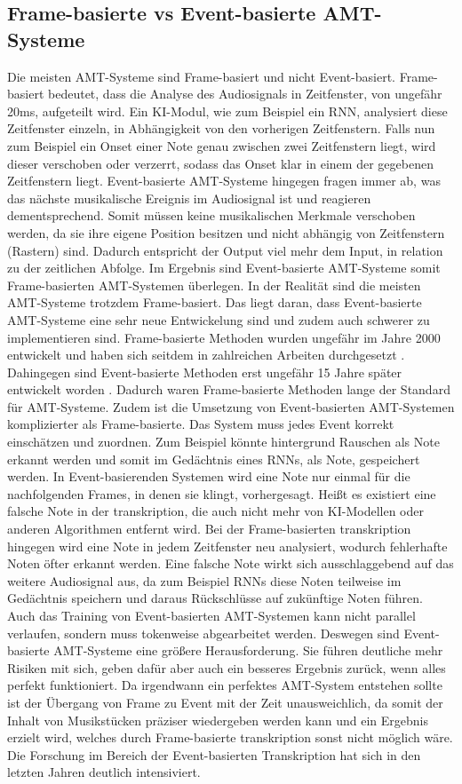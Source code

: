 \subsection{Frame-basierte vs Event-basierte AMT-Systeme}
Die meisten AMT-Systeme sind Frame-basiert und nicht Event-basiert.
Frame-basiert bedeutet, dass die Analyse des Audiosignals in Zeitfenster, von ungefähr 20ms, aufgeteilt wird.
Ein KI-Modul, wie zum Beispiel ein RNN, analysiert diese Zeitfenster einzeln,
in Abhängigkeit von den vorherigen Zeitfenstern.
Falls nun zum Beispiel ein Onset einer Note genau zwischen zwei Zeitfenstern liegt,
wird dieser verschoben oder verzerrt, sodass das Onset klar in einem der gegebenen Zeitfenstern liegt.
Event-basierte AMT-Systeme hingegen fragen immer ab,
was das nächste musikalische Ereignis im Audiosignal ist und reagieren dementsprechend.
Somit müssen keine musikalischen Merkmale verschoben werden,
da sie ihre eigene Position besitzen und nicht abhängig von Zeitfenstern (Rastern) sind.
Dadurch entspricht der Output viel mehr dem Input, in relation zu der zeitlichen Abfolge.
Im Ergebnis sind Event-basierte AMT-Systeme somit Frame-basierten AMT-Systemen überlegen.
In der Realität sind die meisten AMT-Systeme trotzdem Frame-basiert.
Das liegt daran, dass Event-basierte AMT-Systeme eine sehr neue Entwickelung sind
und zudem auch schwerer zu implementieren sind.
Frame-basierte Methoden wurden ungefähr im Jahre 2000 entwickelt
und haben sich seitdem in zahlreichen Arbeiten durchgesetzt .
Dahingegen sind Event-basierte Methoden erst ungefähr 15 Jahre später entwickelt worden .
Dadurch waren Frame-basierte Methoden lange der Standard für AMT-Systeme.
Zudem ist die Umsetzung von Event-basierten AMT-Systemen komplizierter als Frame-basierte.
Das System muss jedes Event korrekt einschätzen und zuordnen.
Zum Beispiel könnte hintergrund Rauschen als Note erkannt werden und somit im
Gedächtnis eines RNNs, als Note, gespeichert werden.
In Event-basierenden Systemen wird eine Note nur einmal für die nachfolgenden Frames, in denen sie klingt, vorhergesagt.
Heißt es existiert eine falsche Note in der transkription,
die auch nicht mehr von KI-Modellen oder anderen Algorithmen entfernt wird.
Bei der Frame-basierten transkription hingegen wird eine Note in jedem Zeitfenster neu analysiert,
wodurch fehlerhafte Noten öfter erkannt werden.
Eine falsche Note wirkt sich ausschlaggebend auf das weitere Audiosignal aus,
da zum Beispiel RNNs diese Noten teilweise im Gedächtnis speichern und daraus Rückschlüsse auf zukünftige Noten führen.
Auch das Training von Event-basierten AMT-Systemen kann nicht parallel verlaufen,
sondern muss tokenweise abgearbeitet werden.
Deswegen sind Event-basierte AMT-Systeme eine größere Herausforderung.
Sie führen deutliche mehr Risiken mit sich, geben dafür aber auch ein besseres Ergebnis zurück, wenn alles perfekt funktioniert.
Da irgendwann ein perfektes AMT-System entstehen sollte ist der Übergang von
Frame zu Event mit der Zeit unausweichlich, da somit der Inhalt von Musikstücken
präziser wiedergeben werden kann und ein Ergebnis erzielt wird,
welches durch Frame-basierte transkription sonst nicht möglich wäre.
Die Forschung im Bereich der Event-basierten Transkription hat sich in den letzten Jahren deutlich intensiviert.

